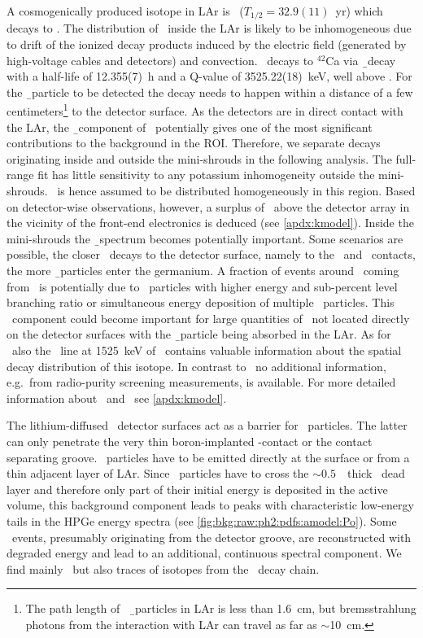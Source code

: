 \blocktitle{\kvz}
A cosmogenically produced isotope in LAr is \Arh\ ($T_{1/2} = 32.9(11)$~yr) which decays
to \kvz. The distribution of \kvz\ inside the LAr is likely to be inhomogeneous due to
drift of the ionized decay products induced by the electric field (generated by
high-voltage cables and detectors) and convection. \kvz\ decays to $^{42}$Ca via \b\ decay
with a half-life of 12.355(7)~h and a Q-value of 3525.22(18)~keV, well above \qbb. For the
\b\ particle to be detected the decay needs to happen within a distance of a few
centimeters\footnote{The path length of \kvz\ \b\ particles in LAr is less than 1.6~cm,
but bremsstrahlung photons from the interaction with LAr can travel as far as
$\sim$10~cm.} to the detector surface. As the detectors are in direct contact with the
LAr, the \b\ component of \kvz\ potentially gives one of the most significant
contributions to the background in the ROI. Therefore, we separate decays originating
inside and outside the mini-shrouds in the following analysis. The full-range fit has
little sensitivity to any potassium inhomogeneity outside the mini-shrouds. \kvz\ is hence
assumed to be distributed homogeneously in this region. Based on detector-wise
observations, however, a surplus of \kvz\ above the detector array in the vicinity of the
front-end electronics is deduced (see \cref{apdx:kmodel}). Inside the mini-shrouds the \b\
spectrum becomes potentially important.  Some scenarios are possible, the closer \kvz\
decays to the detector surface, namely to the \nplus\ and \pplus\ contacts, the more \b\
particles enter the germanium. A fraction of events around \qbb\ coming from \kvz\ is
potentially due to \g\ particles with higher energy and sub-percent level branching ratio
or simultaneous energy deposition of multiple \g\ particles. This \g\ component could
become important for large quantities of \kvz\ not located directly on the detector
surfaces with the \b\ particle being absorbed in the LAr. As for \kvn\ also the \g\ line
at 1525~keV of \kvz\ contains valuable information about the spatial decay distribution of
this isotope. In contrast to \kvn\ no additional information, e.g.~from radio-purity
screening measurements, is available. For more detailed information about \kvn{}nd \kvz\
see \cref{apdx:kmodel}.

\blocktitle{\a\ emitters}
The lithium-diffused \nplus\ detector surfaces act as a barrier for \a\ particles. The
latter can only penetrate the very thin boron-implanted \pplus-contact or the contact
separating groove. \a\ particles have to be emitted directly at the surface or from a thin
adjacent layer of LAr. Since \a\ particles have to cross the $\sim 0.5$~\mum\ thick
\pplus\ dead layer and therefore only part of their initial energy is deposited in the
active volume, this background component leads to peaks with characteristic low-energy
tails in the HPGe energy spectra (see \cref{fig:bkg:raw:ph2:pdfs:amodel:Po}). Some \a\
events, presumably originating from the detector groove, are reconstructed with degraded
energy and lead to an additional, continuous spectral component. We find mainly \Po\ but
also traces of isotopes from the \Ra\ decay chain.

